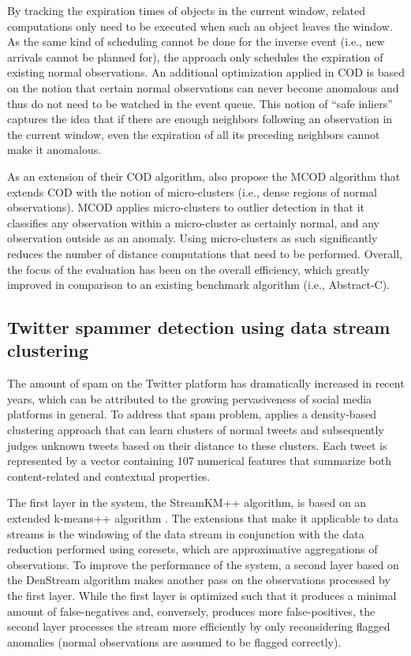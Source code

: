 By tracking the expiration times of objects in the current window, related computations only need to be executed when such an object leaves the window. As the same kind of scheduling cannot be done for the inverse event (i.e., new arrivals cannot be planned for), the approach only schedules the expiration of existing normal observations. An additional optimization applied in COD is based on the notion that certain normal observations can never become anomalous and thus do not need to be watched in the event queue. This notion of “safe inliers” captures the idea that if there are enough neighbors following an observation in the current window, even the expiration of all its preceding neighbors cannot make it anomalous.

As an extension of their COD algorithm, \citet{kontaki_continuous_2011} also propose the MCOD algorithm that extends COD with the notion of micro-clusters (i.e., dense regions of normal observations). MCOD applies micro-clusters to outlier detection in that it classifies any observation within a micro-cluster as certainly normal, and any observation outside as an anomaly. Using micro-clusters as such significantly reduces the number of distance computations that need to be performed. Overall, the focus of the evaluation has been on the overall efficiency, which greatly improved in comparison to an existing benchmark algorithm (i.e., Abstract-C).


\subsection{Twitter spammer detection using data stream clustering \citep{miller_twitter_2014}}
The amount of spam on the Twitter platform has dramatically increased in recent years, which can be attributed to the growing pervasiveness of social media platforms in general. To address that spam problem, \citet{miller_twitter_2014} applies a density-based clustering approach that can learn clusters of normal tweets and subsequently judges unknown tweets based on their distance to these clusters. Each tweet is represented by a vector containing 107 numerical features that summarize both content-related and contextual properties.

The first layer in the system, the StreamKM++ algorithm, is based on an extended k-means++ algorithm \citep{ackermann_streamkm_2012}. The extensions that make it applicable to data streams is the windowing of the data stream in conjunction with the data reduction performed using coresets, which are approximative aggregations of observations. To improve the performance of the system, a second layer based on the DenStream algorithm makes another pass on the observations processed by the first layer. While the first layer is optimized such that it produces a minimal amount of false-negatives and, conversely, produces more false-positives, the second layer processes the stream more efficiently by only reconsidering flagged anomalies (normal observations are assumed to be flagged correctly).


